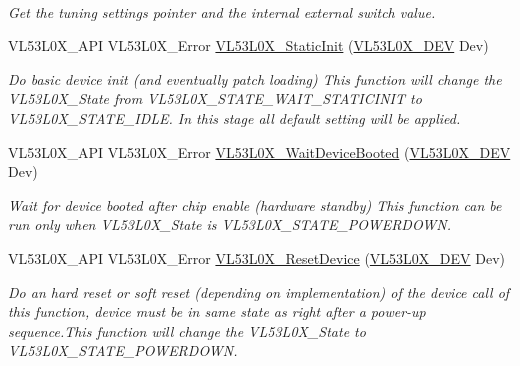 \begin{DoxyCompactItemize}
$$\begin{DoxyCompactList}\small\item\em Get the tuning settings pointer and the internal external switch value. \end{DoxyCompactList}\item 
V\+L53\+L0\+X\+\_\+\+A\+PI V\+L53\+L0\+X\+\_\+\+Error \hyperlink{group__VL53L0X__init__group_ga7cf27cba40b2f87dabdc5020aa567b77}{V\+L53\+L0\+X\+\_\+\+Static\+Init} (\hyperlink{group__VL53L0X__platform__group_ga2d6405308b1dd524b462f1b8fb97d167}{V\+L53\+L0\+X\+\_\+\+D\+EV} Dev)
\begin{DoxyCompactList}\small\item\em Do basic device init (and eventually patch loading) This function will change the V\+L53\+L0\+X\+\_\+\+State from V\+L53\+L0\+X\+\_\+\+S\+T\+A\+T\+E\+\_\+\+W\+A\+I\+T\+\_\+\+S\+T\+A\+T\+I\+C\+I\+N\+IT to V\+L53\+L0\+X\+\_\+\+S\+T\+A\+T\+E\+\_\+\+I\+D\+LE. In this stage all default setting will be applied. \end{DoxyCompactList}\item 
V\+L53\+L0\+X\+\_\+\+A\+PI V\+L53\+L0\+X\+\_\+\+Error \hyperlink{group__VL53L0X__init__group_ga079f2bafbcb26cb4ccf897bb835fcdc8}{V\+L53\+L0\+X\+\_\+\+Wait\+Device\+Booted} (\hyperlink{group__VL53L0X__platform__group_ga2d6405308b1dd524b462f1b8fb97d167}{V\+L53\+L0\+X\+\_\+\+D\+EV} Dev)
\begin{DoxyCompactList}\small\item\em Wait for device booted after chip enable (hardware standby) This function can be run only when V\+L53\+L0\+X\+\_\+\+State is V\+L53\+L0\+X\+\_\+\+S\+T\+A\+T\+E\+\_\+\+P\+O\+W\+E\+R\+D\+O\+WN. \end{DoxyCompactList}\item 
V\+L53\+L0\+X\+\_\+\+A\+PI V\+L53\+L0\+X\+\_\+\+Error \hyperlink{group__VL53L0X__init__group_gab089144ebdc35ee9abca9ca6c785561c}{V\+L53\+L0\+X\+\_\+\+Reset\+Device} (\hyperlink{group__VL53L0X__platform__group_ga2d6405308b1dd524b462f1b8fb97d167}{V\+L53\+L0\+X\+\_\+\+D\+EV} Dev)
\begin{DoxyCompactList}\small\item\em Do an hard reset or soft reset (depending on implementation) of the device  call of this function, device must be in same state as right after a power-\/up sequence.\+This function will change the V\+L53\+L0\+X\+\_\+\+State to V\+L53\+L0\+X\+\_\+\+S\+T\+A\+T\+E\+\_\+\+P\+O\+W\+E\+R\+D\+O\+WN. \end{DoxyCompactList}\end{DoxyCompactItemize}


